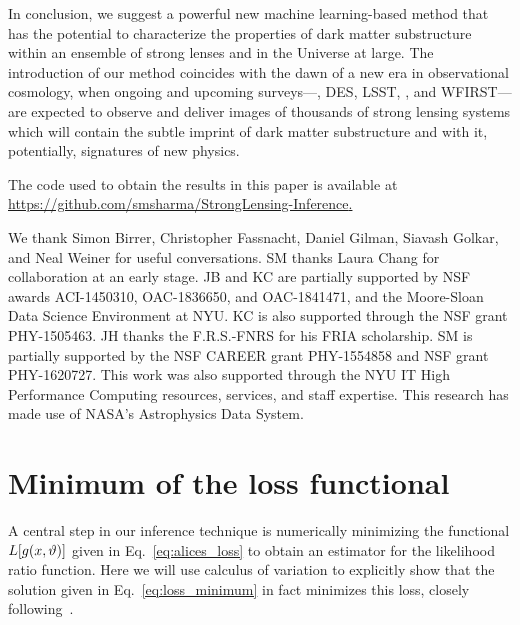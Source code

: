 \documentclass[twocolumn]{aastex62}
\begin{document}
In conclusion, we suggest a powerful new machine learning-based method that has the potential to characterize the properties of dark matter substructure within an ensemble of strong lenses and in the Universe at large. The introduction of our method coincides with the dawn of a new era in observational cosmology, when ongoing and upcoming surveys---\eg, DES, LSST, \Euclid, and WFIRST---are expected to observe and deliver images of thousands of strong lensing systems which will contain the subtle imprint of dark matter substructure and with it, potentially, signatures of new physics.

The code used to obtain the results in this paper is available at \url{https://github.com/smsharma/StrongLensing-Inference}\href{https://github.com/smsharma/StrongLensing-Inference}.


\acknowledgements

We thank Simon Birrer, Christopher Fassnacht, Daniel Gilman, Siavash Golkar, and Neal Weiner for useful conversations. SM thanks Laura Chang for collaboration at an early stage. JB and KC are partially supported by NSF awards ACI-1450310, OAC-1836650, and OAC-1841471, and the Moore-Sloan Data Science Environment at NYU. KC is also supported through the NSF grant PHY-1505463. JH thanks the F.R.S.-FNRS for his FRIA scholarship. SM is partially supported by the NSF CAREER grant PHY-1554858 and NSF grant PHY-1620727. This work was also supported through the NYU IT High Performance Computing resources, services, and staff expertise. This research has made use of NASA's Astrophysics Data System.



\appendix
\section{Minimum of the loss functional}
\label{app:variation}

A central step in our inference technique is numerically minimizing the functional $L[g(x, \vartheta)]$ given in Eq.~\eqref{eq:alices_loss} to obtain an estimator for the likelihood ratio function. Here we will use calculus of variation to explicitly show that the solution given in Eq.~\eqref{eq:loss_minimum} in fact minimizes this loss, closely following~\citet{1805.00020, Stoye:2018ovl}.
\end{document}
